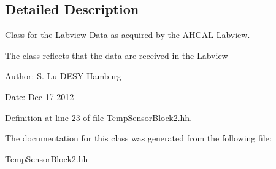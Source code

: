 \subsection{Detailed Description}
Class for the Labview Data as acquired by the AHCAL Labview. 

The class reflects that the data are received in the Labview \begin{Desc}
\item[Author:]S. Lu DESY Hamburg \end{Desc}
\begin{Desc}
\item[Date:]Dec 17 2012 \end{Desc}




Definition at line 23 of file Temp\-Sensor\-Block2.hh.

The documentation for this class was generated from the following file:\begin{CompactItemize}
\item 
Temp\-Sensor\-Block2.hh\end{CompactItemize}
